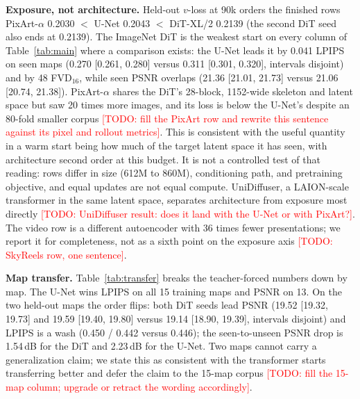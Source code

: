 \documentclass[10pt]{article}
\newcommand{\todo}[1]{\textcolor{red}{[TODO: #1]}}
\begin{document}
\textbf{Exposure, not architecture.} Held-out $v$-loss at 90k orders the finished rows PixArt-$\alpha$ 0.2030 $<$ U-Net 0.2043 $<$ DiT-XL/2 0.2139 (the second DiT seed also ends at 0.2139). The ImageNet DiT is the weakest start on every column of Table~\ref{tab:main} where a comparison exists: the U-Net leads it by 0.041 LPIPS on seen maps (0.270 [0.261, 0.280] versus 0.311 [0.301, 0.320], intervals disjoint) and by 48 FVD$_{16}$, while seen PSNR overlaps (21.36 [21.01, 21.73] versus 21.06 [20.74, 21.38]). PixArt-$\alpha$ shares the DiT's 28-block, 1152-wide skeleton and latent space but saw 20 times more images, and its loss is below the U-Net's despite an 80-fold smaller corpus \todo{fill the PixArt row and rewrite this sentence against its pixel and rollout metrics}. This is consistent with the useful quantity in a warm start being how much of the target latent space it has seen, with architecture second order at this budget. It is not a controlled test of that reading: rows differ in size (612M to 860M), conditioning path, and pretraining objective, and equal updates are not equal compute. UniDiffuser, a LAION-scale transformer in the same latent space, separates architecture from exposure most directly \todo{UniDiffuser result: does it land with the U-Net or with PixArt?}. The video row is a different autoencoder with 36 times fewer presentations; we report it for completeness, not as a sixth point on the exposure axis \todo{SkyReels row, one sentence}.

\textbf{Map transfer.} Table~\ref{tab:transfer} breaks the teacher-forced numbers down by map. The U-Net wins LPIPS on all 15 training maps and PSNR on 13. On the two held-out maps the order flips: both DiT seeds lead PSNR (19.52 [19.32, 19.73] and 19.59 [19.40, 19.80] versus 19.14 [18.90, 19.39], intervals disjoint) and LPIPS is a wash (0.450 / 0.442 versus 0.446); the seen-to-unseen PSNR drop is 1.54\,dB for the DiT and 2.23\,dB for the U-Net. Two maps cannot carry a generalization claim; we state this as consistent with the transformer starts transferring better and defer the claim to the 15-map corpus \todo{fill the 15-map column; upgrade or retract the wording accordingly}.
\end{document}
